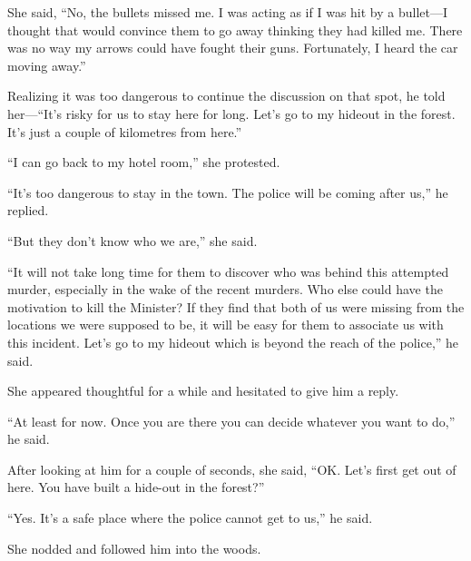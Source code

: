She said, “No, the bullets missed me. I was acting as if I was hit by a bullet—I
thought that would convince them to go away thinking they had killed me. There
was no way my arrows could have fought their guns. Fortunately, I heard the car
moving away.”

Realizing it was too dangerous to continue the discussion on that spot, he told
her—“It's risky for us to stay here for long. Let's go to my hideout in the
forest. It's just a couple of kilometres from here.”

“I can go back to my hotel room,” she protested.

“It's too dangerous to stay in the town. The police will be coming after us,” he
replied.

“But they don't know who we are,” she said.

“It will not take long time for them to discover who was behind this attempted
murder, especially in the wake of the recent murders. Who else could have the
motivation to kill the Minister? If they find that both of us were missing from
the locations we were supposed to be, it will be easy for them to associate us
with this incident. Let's go to my hideout which is beyond the reach of the
police,” he said.

She appeared thoughtful for a while and hesitated to give him a reply.

“At least for now. Once you are there you can decide whatever you want to do,”
he said.

After looking at him for a couple of seconds, she said, “OK. Let's first get out
of here. You have built a hide-out in the forest?”

“Yes. It's a safe place where the police cannot get to us,” he said.

She nodded and followed him into the woods.